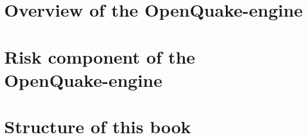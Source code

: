 \section{Overview of the OpenQuake-engine}
\label{sec:oq-engine-overview}


\section{Risk component of the OpenQuake-engine}
\label{sec:oq-engine-risk}


\section{Structure of this book}
\label{sec:structure}


